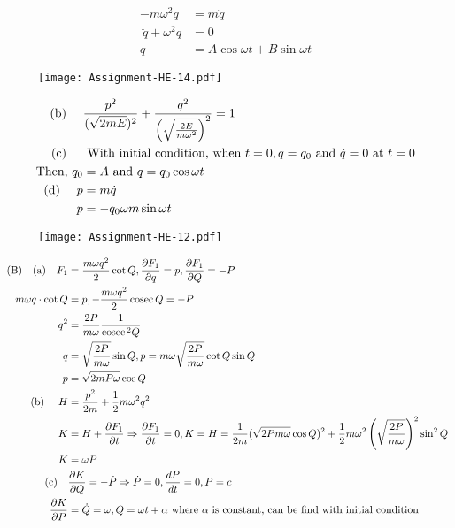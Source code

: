 \begin{enumerate}
\begin{answer}
\begin{align*}
	-m \omega^{2} q&=m \ddot{q}\\\
	\ddot{q}+\omega^{2} q&=0\\
	q&=A \cos \omega t+B \sin \omega t
	\end{align*}
		\begin{figure}[H]
		\centering
		\texttt{[image: Assignment-HE-14.pdf]}
	\end{figure}
	\begin{align*}
	\text{(b) \quad}&\frac{p^{2}}{(\sqrt{2 m E})^{2}}+\frac{q^{2}}{\left(\sqrt{\frac{2 E}{m \omega^{2}}}\right)^{2}}=1\\
	\text{(c) \quad}&\text{ With initial condition, when }t=0, q=q_{0}\text{ and } \dot{q}=0\text{ at }t=0\\
	\text{Then, }q_{0}&=A\text{ and }q=q_{0} \cos \omega t\\
	\text{(d) }\quad p&=m \dot{q}\\
	p&=-q_{0} \omega m \sin \omega t
	\end{align*}
		\begin{figure}[H]
		\centering
		\texttt{[image: Assignment-HE-12.pdf]}
	\end{figure}
	\begin{align*}
\text{	(B)\quad  (a)\quad }F_{1}&=\frac{m \omega q^{2}}{2} \cot Q, \frac{\partial F_{1}}{\partial q}=p, \frac{\partial F_{1}}{\partial Q}=-P\\
m \omega q \cdot \cot Q&=p,-\frac{m \omega q^{2}}{2} \operatorname{cosec} Q=-P\\
q^{2}&=\frac{2 P}{m \omega} \frac{1}{\operatorname{cosec}{ }^{2} Q}\\
q&=\sqrt{\frac{2 P}{m \omega}} \sin Q, p=m \omega \sqrt{\frac{2 P}{m \omega}} \cot Q \sin Q\\
p&=\sqrt{2 m P \omega} \cos Q\\
\text{(b) }\quad H&=\frac{p^{2}}{2 m}+\frac{1}{2} m \omega^{2} q^{2}\\
K&=H+\frac{\partial F_{1}}{\partial t} \Rightarrow \frac{\partial F_{1}}{\partial t}=0, K=H=\frac{1}{2 m}(\sqrt{2 P m \omega} \cos Q)^{2}+\frac{1}{2} m \omega^{2}\left(\sqrt{\frac{2 P}{m \omega}}\right)^{2} \sin ^{2} Q\\
K&=\omega P\\
\text{(c)\quad}&
\frac{\partial K}{\partial Q}=-\dot{P} \Rightarrow \dot{P}=0, \frac{d P}{d t}=0, P=c\\
\frac{\partial K}{\partial P}&=\dot{Q}=\omega, Q=\omega t+\alpha\text{ where } \alpha\text{ is constant, can be find with initial condition}

\end{align*}
\end{answer}
\end{enumerate}
